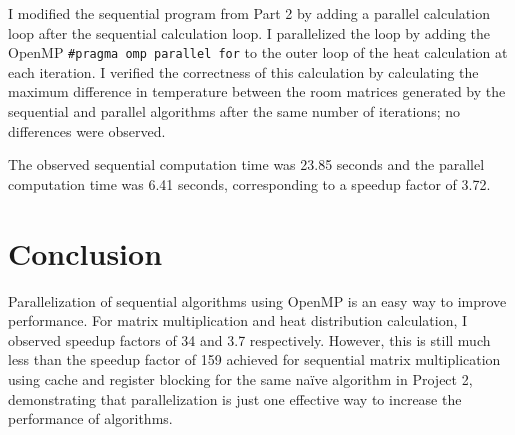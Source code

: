 \documentclass[12pt,letterpaper,oneside]{article}
\begin{document}
I modified the sequential program from Part 2 by adding a parallel calculation loop after the sequential calculation loop. 
I parallelized the loop by adding the OpenMP \texttt{#pragma omp parallel for} to the outer loop of the heat calculation at each iteration.
I verified the correctness of this calculation by calculating the maximum difference in temperature between the room matrices generated by the sequential and parallel algorithms
after the same number of iterations; no differences were observed.

The observed sequential computation time was 23.85 seconds and the parallel computation time was 6.41 seconds, corresponding to a speedup factor of 3.72.

\section*{Conclusion}

Parallelization of sequential algorithms using OpenMP is an easy way to improve performance. For matrix multiplication and heat distribution calculation, I observed speedup factors of 34 and 3.7 respectively. 
However, this is still much less than the speedup factor of 159 achieved for sequential matrix multiplication using cache and register blocking for the same naïve algorithm in Project 2, demonstrating that parallelization is just one effective way to increase the performance of algorithms.
\end{document}
